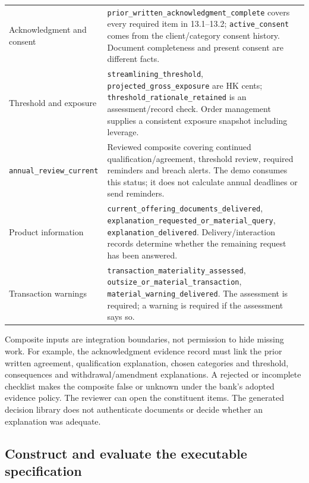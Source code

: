 \documentclass[12pt,a4paper,oneside,openany]{book}
\begin{document}
\begin{longtable}{P{0.30\textwidth}P{0.60\textwidth}}
Acknowledgment and consent & \texttt{prior\_written\_acknowledgment\_complete} covers every required item in 13.1--13.2; \texttt{active\_consent} comes from the client/category consent history. Document completeness and present consent are different facts.\\
Threshold and exposure & \texttt{streamlining\_threshold}, \texttt{projected\_gross\_exposure} are HK cents; \texttt{threshold\_rationale\_retained} is an assessment/record check. Order management supplies a consistent exposure snapshot including leverage.\\
\texttt{annual\_review\_current} & Reviewed composite covering continued qualification/agreement, threshold review, required reminders and breach alerts. The demo consumes this status; it does not calculate annual deadlines or send reminders.\\
Product information & \texttt{current\_offering\_documents\_delivered}, \texttt{explanation\_requested\_or\_material\_query}, \texttt{explanation\_delivered}. Delivery/interaction records determine whether the remaining request has been answered.\\
Transaction warnings & \texttt{transaction\_materiality\_assessed}, \texttt{outsize\_or\_material\_transaction}, \texttt{material\_warning\_delivered}. The assessment is required; a warning is required if the assessment says so.\\
\bottomrule
\end{longtable}
\endgroup

Composite inputs are integration boundaries, not permission to hide missing
work. For example, the acknowledgment evidence record must link the prior
written agreement, qualification explanation, chosen categories and threshold,
consequences and withdrawal/amendment explanations. A rejected or incomplete
checklist makes the composite false or unknown under the bank's adopted evidence
policy. The reviewer can open the constituent items. The generated decision
library does not authenticate documents or decide whether an explanation was
adequate.

\subsection{Construct and evaluate the executable specification}
\label{merge:P-01b-complete-dry-run:04}
\end{document}
